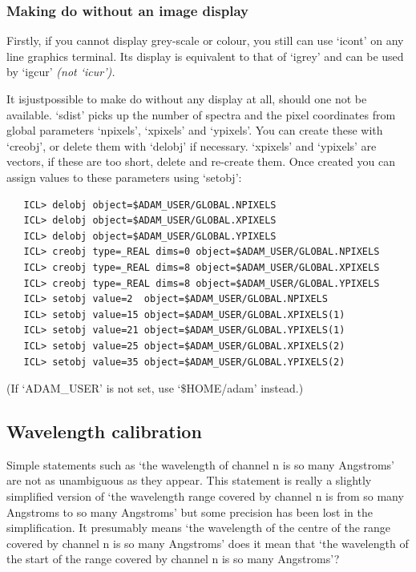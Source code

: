 \subsubsection{\label{techno7nodisp}Making do without an image display}

   Firstly, if you cannot display grey-scale or colour, you still can use
   `icont' on any line graphics terminal. Its display is equivalent to
   that of `igrey' and can be used by `igcur' {\em (not `icur').\/}

   It is\latorhtm{---}{-}just\latorhtm{---}{-}possible to make do without
   any display at all, should
   one not be available. `sdist' picks up the number of spectra and the
   pixel coordinates from global parameters `npixels', `xpixels' and
   `ypixels'. You can create these with `creobj', or delete them with
   `delobj' if necessary. `xpixels' and `ypixels' are vectors, if these
   are too short, delete and re-create them. Once created you can assign
   values to these parameters using `setobj':

\begin{verbatim}
   ICL> delobj object=$ADAM_USER/GLOBAL.NPIXELS
   ICL> delobj object=$ADAM_USER/GLOBAL.XPIXELS
   ICL> delobj object=$ADAM_USER/GLOBAL.YPIXELS
   ICL> creobj type=_REAL dims=0 object=$ADAM_USER/GLOBAL.NPIXELS
   ICL> creobj type=_REAL dims=8 object=$ADAM_USER/GLOBAL.XPIXELS
   ICL> creobj type=_REAL dims=8 object=$ADAM_USER/GLOBAL.YPIXELS
   ICL> setobj value=2  object=$ADAM_USER/GLOBAL.NPIXELS
   ICL> setobj value=15 object=$ADAM_USER/GLOBAL.XPIXELS(1)
   ICL> setobj value=21 object=$ADAM_USER/GLOBAL.YPIXELS(1)
   ICL> setobj value=25 object=$ADAM_USER/GLOBAL.XPIXELS(2)
   ICL> setobj value=35 object=$ADAM_USER/GLOBAL.YPIXELS(2)
\end{verbatim}

   (If `ADAM\_USER' is not set, use `\$HOME/adam' instead.)


\subsection{\label{techno8}Wavelength calibration}

   Simple statements such as `the wavelength of channel n is so many
   Angstroms' are not as unambiguous as they appear.  This statement is
   really a slightly simplified version of `the wavelength range covered
   by channel n is from so many Angstroms to so many Angstroms' but some
   precision has been lost in the simplification.  It presumably means
   `the wavelength of the centre of the range covered by channel n is so
   many Angstroms'
   does it mean that `the wavelength of the start of the range covered
   by channel n is so many Angstroms'?

